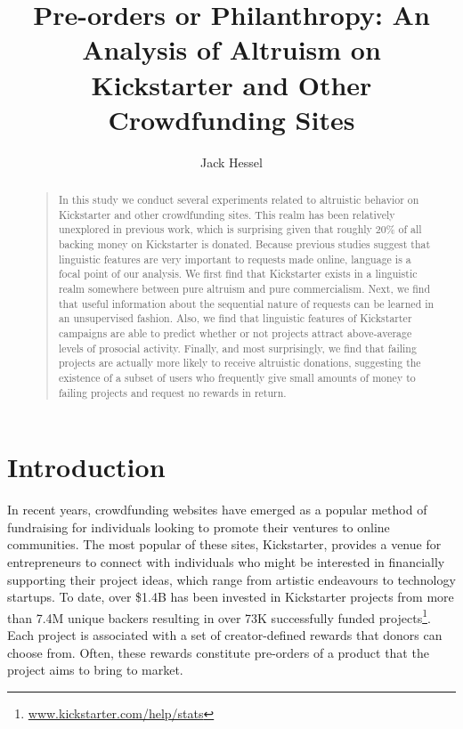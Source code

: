 \documentclass[letterpaper]{article}
\begin{document}
\title{Pre-orders or Philanthropy: An Analysis of Altruism on Kickstarter and Other Crowdfunding Sites}
\author{Jack Hessel}
\maketitle
\begin{abstract}
\begin{quote}
In this study we conduct several experiments related to altruistic behavior on Kickstarter and other crowdfunding sites. This realm has been relatively unexplored in previous work, which is surprising given that roughly 20\% of all backing money on Kickstarter is donated. Because previous studies suggest that linguistic features are very important to requests made online, language is a focal point of our analysis. We first find that Kickstarter exists in a linguistic realm somewhere between pure altruism and pure commercialism. Next, we find that useful information about the sequential nature of requests can be learned in an unsupervised fashion. Also, we find that linguistic features of Kickstarter campaigns are able to predict whether or not projects attract above-average levels of prosocial activity. Finally, and most surprisingly, we find that failing projects are actually more likely to receive altruistic donations, suggesting the existence of a subset of users who frequently give small amounts of money to failing projects and request no rewards in return.
\end{quote}
\end{abstract}

\section{Introduction}

In recent years, crowdfunding websites have emerged as a popular method of fundraising for individuals looking to promote their ventures to online communities. The most popular of these sites, Kickstarter, provides a venue for entrepreneurs to connect with individuals who might be interested in financially supporting their project ideas, which range from artistic endeavours to technology startups. To date, over \$1.4B has been invested in Kickstarter projects from more than 7.4M unique backers resulting in over 73K successfully funded projects\footnote{ \url{www.kickstarter.com/help/stats}}. Each project is associated with a set of creator-defined rewards that donors can choose from. Often, these rewards constitute pre-orders of a product that the project aims to bring to market.
\end{document}
